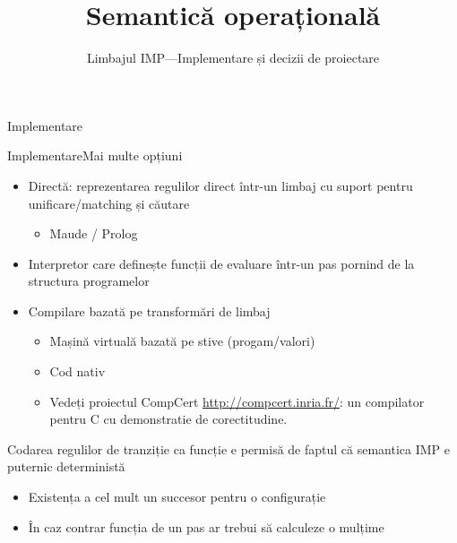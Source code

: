 \documentclass[xcolor=pdftex,romanian,colorlinks]{beamer}
\title[SLP---IMP]{Semantică operațională}
\subtitle{Limbajul IMP—Implementare și decizii de proiectare}
\begin{document}
\begin{frame}
  \titlepage
\end{frame}
\begin{section}{Implementare}
\begin{frame}{Implementare}{Mai multe opțiuni}
\begin{itemize}
\item Directă:  reprezentarea regulilor direct într-un limbaj cu suport pentru unificare/matching și căutare
\begin{itemize}
\item Maude / Prolog
\end{itemize}
\item Interpretor care definește funcții de evaluare într-un pas pornind de la structura programelor
\item Compilare bazată pe transformări de limbaj
\begin{itemize}
\item Mașină virtuală bazată pe stive (progam/valori)
\item Cod nativ
\item Vedeți proiectul CompCert \url{http://compcert.inria.fr/}: un compilator pentru C cu demonstratie de corectitudine.
\end{itemize} 
\end{itemize}

\vfill
{}
Codarea regulilor de tranziție ca funcție e permisă de faptul că semantica IMP e puternic deterministă
\begin{itemize}
  \item Existența a cel mult un succesor pentru o configurație
  \item În caz contrar funcția de un pas ar trebui să calculeze o mulțime 
\end{itemize}
\end{frame}
\end{section}
\end{document}
